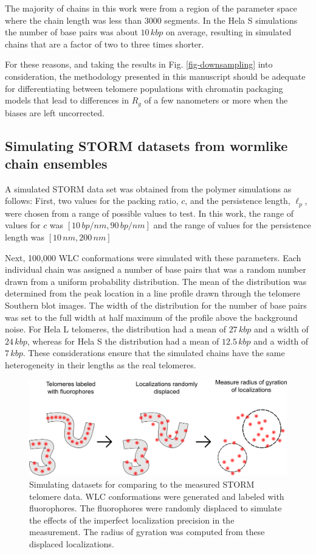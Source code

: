 \documentclass[12pt, a4paper]{article}
\begin{document}
The majority of chains in this work were from a region of the
parameter space where the chain length was less than 3000
segments. In the Hela S simulations the number of base pairs was
about $10 \, kbp$ on average, resulting in simulated chains that
are a factor of two to three times shorter.

For these reasons, and taking the results in
Fig. \ref{fig-downsampling} into consideration, the methodology
presented in this manuscript should be adequate for
differentiating between telomere populations with chromatin
packaging models that lead to differences in $R_g$ of a few
nanometers or more when the biases are left uncorrected.

\subsection{Simulating STORM datasets from wormlike chain ensembles}
\label{sec-2-3}
\label{sec-STORMDatasets}
A simulated STORM data set was obtained from the polymer
simulations as follows: First, two values for the packing ratio,
$c$, and the persistence length, $\ell_p$, were chosen from a range
of possible values to test. In this work, the range of values for
$c$ was $\left[ 10 \, bp/nm, 90 \, bp/nm \right]$ and the range of
values for the persistence length was $\left[ 10 \, nm, 200 \, nm
   \right]$

Next, 100,000 WLC conformations were simulated with these
parameters. Each individual chain was assigned a number of base
pairs that was a random number drawn from a uniform probability
distribution. The mean of the distribution was determined from the
peak location in a line profile drawn through the telomere Southern
blot images. The width of the distribution for the number of base
pairs was set to the full width at half maximum of the profile
above the background noise. For Hela L telomeres, the distribution
had a mean of $27 \, kbp$ and a width of $24 \, kbp$, whereas for
Hela S the distribution had a mean of $12.5 \, kbp$ and a width of
$7 \, kbp$. These considerations ensure that the simulated chains
have the same heterogeneity in their lengths as the real telomeres.

\begin{figure}
   \centering
   \includegraphics[scale = 1.5]{fig-GenerateSTORMDataset.png}
   \caption{Simulating datasets for comparing to the measured STORM telomere data. WLC conformations were generated and labeled with fluorophores. The fluorophores were randomly displaced to simulate the effects of the imperfect localization precision in the measurement. The radius of gyration was computed from these displaced localizations.}
   \label{fig-GenerateSTORMDataset}
 \end{figure}
\end{document}

